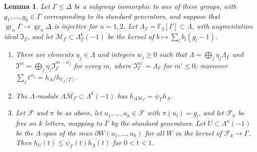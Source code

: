 \documentclass[11pt]{amsart}
\numberwithin{equation}{section}
\newtheorem{lemma}[equation]{Lemma}
\theoremstyle{definition}
\theoremstyle{remark}
\newcommand{\Ftwo}{\mathbb F_2}
\begin{document}
\begin{lemma}\label{tw:filtered-local-freeness}
Let $\Gamma\le\Delta$ be a subgroup isomorphic to one of these groups, with
$g_1,\dots,g_k\in\Gamma$ corresponding to its standard generators, and
suppose that $\operatorname{gr}_n\Gamma\to\operatorname{gr}_n\Delta$ is
injective for $n=1,2$. Let $\Lambda_\Gamma=\Ftwo[\Gamma]\subset\Lambda$, with
augmentation ideal $\mathfrak I_\Gamma$, and let
$\mathcal M_\Gamma\subset\Lambda_\Gamma^k(-1)$ be the kernel of
$b\mapsto\sum_lb_l(g_l-1)$.
\begin{enumerate}
\item[(a)] There are elements $\eta_j\in\Lambda$ and integers $w_j\ge0$ such
 that $\Lambda=\bigoplus_j\eta_j\Lambda_\Gamma$ and
 $\mathfrak I^m=\bigoplus_j\eta_j\mathfrak I_\Gamma^{m-w_j}$ for every $m$,
 where $\mathfrak I_\Gamma^{m'}=\Lambda_\Gamma$ for $m'\le0$; moreover
 $\sum_jt^{w_j}=h_\Lambda/h_{\Ftwo[\Gamma]}$.
\item[(b)] The $\Lambda$-module $\Lambda\mathcal M_\Gamma\subset\Lambda^k(-1)$
 has $h_{\Lambda\mathcal M_\Gamma}=\psi_\Gamma h_\Lambda$.
\item[(c)] Let $\mathcal F$ and $\pi$ be as above, let
 $u_1,\dots,u_k\in\mathcal F$ with $\pi(u_l)=g_l$, and let $\mathcal F_k$ be
 free on $k$ letters, mapping to $\Gamma$ by the standard generators. Let
 $U\subset\Lambda^n(-1)$ be the $\Lambda$-span of the rows
 $\partial W(u_1,\dots,u_k)$ for all $W$ in the kernel of
 $\mathcal F_k\to\Gamma$. Then $h_U(t)\le\psi_\Gamma(t)h_\Lambda(t)$ for
 $0<t<1$.
\end{enumerate}
\end{lemma}
\end{document}
